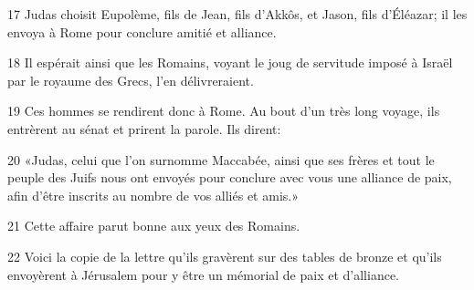17 Judas choisit Eupolème, fils de Jean, fils d’Akkôs, et Jason, fils d’Éléazar; il les envoya à Rome pour conclure amitié et alliance.

18 Il espérait ainsi que les Romains, voyant le joug de servitude imposé à Israël par le royaume des Grecs, l’en délivreraient.

19 Ces hommes se rendirent donc à Rome. Au bout d’un très long voyage, ils entrèrent au sénat et prirent la parole. Ils dirent:

20 «Judas, celui que l’on surnomme Maccabée, ainsi que ses frères et tout le peuple des Juifs nous ont envoyés pour conclure avec vous une alliance de paix, afin d’être inscrits au nombre de vos alliés et amis.»

21 Cette affaire parut bonne aux yeux des Romains.

22 Voici la copie de la lettre qu’ils gravèrent sur des tables de bronze et qu’ils envoyèrent à Jérusalem pour y être un mémorial de paix et d’alliance.
